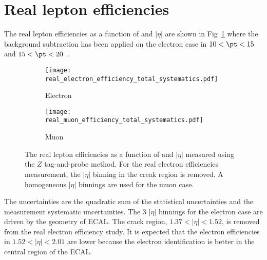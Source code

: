 
\section{Real lepton efficiencies}
\label{sec:app_RLE}
The real lepton efficiencies as a function of \pt and $|\eta|$ are shown in Fig~\ref{fig:app_RLE_real_efficiency_total_systematics} where the background subtraction has been applied on the electron case in $10 < \pt < 15$~{\GeV} and $15 < \pt < 20$~{\GeV}.
%
\begin{figure}[htb]
    \begin{subfigure}[b]{0.48\textwidth}
        \begin{center}
            \texttt{[image: real\_electron\_efficiency\_total\_systematics.pdf]}
            \caption{Electron}
        \end{center}
    \end{subfigure}
    \begin{subfigure}[b]{0.48\textwidth}
        \begin{center}
            \texttt{[image: real\_muon\_efficiency\_total\_systematics.pdf]}
            \caption{Muon}
        \end{center}
    \end{subfigure}
    \caption{The real lepton efficiencies as a function of \pt and $|\eta|$ measured using the $Z$ tag-and-probe method.
    For the real electron efficiencies measurement, the $|\eta|$ binning in the creak region is removed.
    A homogeneous $|\eta|$ binnings are used for the muon case.}
    \label{fig:app_RLE_real_efficiency_total_systematics}
\end{figure}
%
The uncertainties are the quadratic sum of the statistical uncertainties and the measurement systematic uncertainties.
The 3 $|\eta|$ binnings for the electron case are driven by the geometry of ECAL.
The crack region, $1.37<|\eta|<1.52$, is removed from the real electron efficiency study.
It is expected that the electron efficiencies in $1.52<|\eta|<2.01$ are lower because the electron identification is better in the central region of the ECAL.


